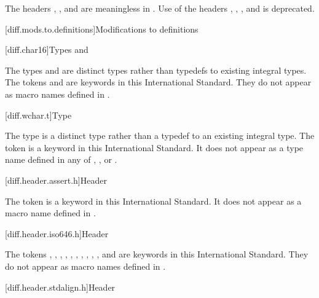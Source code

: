 \pnum
The headers ,
,
and 
are meaningless in \Cpp. Use of
the \Cpp headers , , ,
and  is deprecated.

[diff.mods.to.definitions]{Modifications to definitions}

[diff.char16]{Types  and }

\pnum
The types  and 
are distinct types rather than typedefs to existing integral types.
The tokens  and 
are keywords in this International Standard.
They do not appear as macro names defined in
.

[diff.wchar.t]{Type }

\pnum
The type  is a distinct type rather than a typedef to an
existing integral type.
The token 
is a keyword in this International Standard.
It does not appear as a type name defined in any of
,
,
or .

[diff.header.assert.h]{Header }
%

\pnum
The token  is a keyword in this International
Standard. It does not appear as a macro name defined
in .

[diff.header.iso646.h]{Header }
%

\pnum
The tokens
,
,
,
,
,
,
,
,
,
,
and
are keywords in this International
Standard.
They do not appear as macro names defined in
.
%

[diff.header.stdalign.h]{Header }
%

